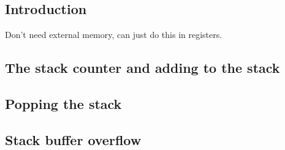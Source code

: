 
\subsection{Introduction}

Don't need external memory, can just do this in registers.

\subsection{The stack counter and adding to the stack}

\subsection{Popping the stack}

\subsection{Stack buffer overflow}


